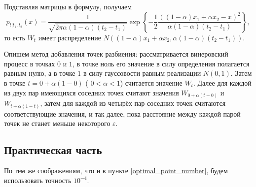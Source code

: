 \documentclass[12pt, a4paper]{article}
\begin{document}
Подставляя матрицы в формулу, получаем
\[
	p_{t\left|t_1,t_2\right. }\left( x\right) = 
		\frac{1}{\sqrt{2\pi\alpha(1-\alpha)(t_2-t_1)}}
		\exp\left\{-\frac 12 
			\frac{\left( \left(1-\alpha\right)x_1+\alpha x_2 - x \right)^2} 
			{\alpha(1-\alpha)(t_2-t_1)}
		\right\},
\]
то есть $W_t$ имеет распределение $N\left( \left( 1-\alpha \right)x_1+\alpha x_2, \alpha(1-\alpha)(t_2-t_1) \right)$.

Опишем метод добавления точек разбиения: рассматривается винеровский процесс в точках $0$ и $1$, в точке ноль его значение в силу определения полагается равным нулю, а в точке $1$ в силу гауссовости равным реализации $N(0,1)$. Затем в точке $t = 0+\alpha(1-0)$ ( $0<\alpha < 1$) считается значение $W_t$. Далее для каждой из двух пар имеющихся соседних точек считают значения $W_{0+\alpha({t-0})}$ и $W_{t+\alpha({1-t})}$, затем для каждой из четырёх пар соседних точек считаются соответствующие значения, и так далее, пока расстояние между каждой парой точек не станет меньше некоторого $\varepsilon$.
\newpage
\subsection{Практическая часть}
По тем же соображениям, что и в пункте \ref{optimal_point_number}, будем использовать точность $10^{-4}$.
\end{document}
